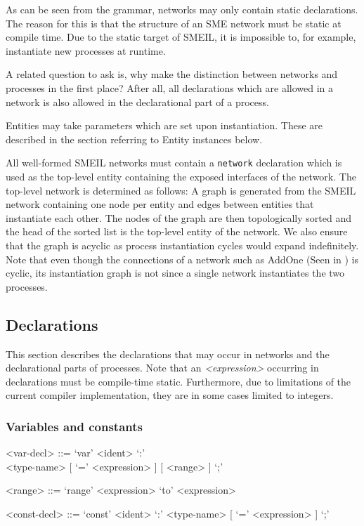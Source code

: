 As can be seen from the grammar, networks may only contain static
declarations. The reason for this is that the structure of an SME network must
be static at compile time. Due to the static target of SMEIL, it is impossible
to, for example, instantiate new processes at runtime.

A related question to ask is, why make the distinction between networks and
processes in the first place? After all, all declarations which are allowed in
a network is also allowed in the declarational part of a process. 


Entities may take parameters which are set upon instantiation. These are
described in the section referring to Entity instances below.


All well-formed SMEIL networks must contain a {\tt network} declaration which is
used as the top-level entity containing the exposed interfaces of the
network. The top-level network is determined as follows: A graph is generated
from the SMEIL network containing one node per entity and edges between entities
that instantiate each other. The nodes of the graph are then topologically
sorted and the head of the sorted list is the top-level entity of the
network. We also ensure that the graph is acyclic as process instantiation
cycles would expand indefinitely. Note that even though the connections of a
network such as AddOne (Seen in ) is cyclic, its
instantiation graph is not since a single network instantiates the two
processes.


\subsection{Declarations}
This section describes the declarations that may occur in {\ttfamily network}s
and the declarational parts of {\ttfamily processe}s. Note that an {\itshape
  <expression>} occurring in declarations must be compile-time
static. Furthermore, due to limitations of the current compiler implementation,
they are in some cases limited to integers.

\subsubsection{Variables and constants}
\begin{grammar}
  <var-decl> ::= `var' <ident> `:' \\ <type-name> [ `=' <expression> ] [ <range> ] `;'

  <range> ::= `range' <expression> `to' <expression>

  <const-decl> ::= `const' <ident> `:' <type-name> [ `=' <expression> ] `;'
\end{grammar}

